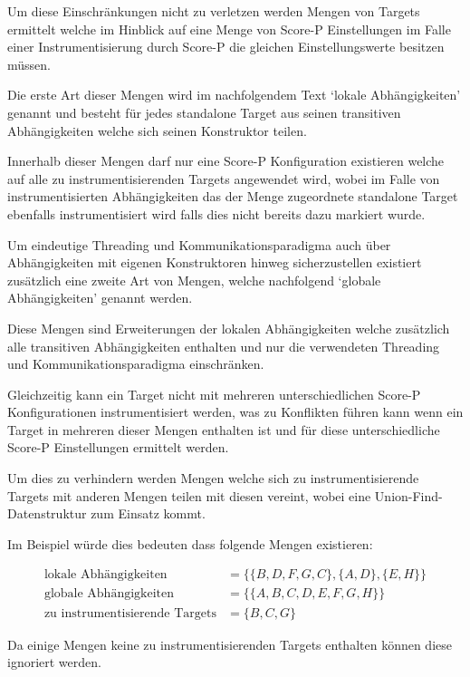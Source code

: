 \documentclass[german,proseminar,hyperref,utf8]{zihpub}
\begin{document}
    Um diese Einschränkungen nicht zu verletzen werden Mengen von Targets ermittelt welche im
    Hinblick auf eine Menge von Score-P Einstellungen im Falle einer Instrumentisierung durch
    Score-P die gleichen Einstellungswerte besitzen müssen.

    Die erste Art dieser Mengen wird im nachfolgendem Text `lokale Abhängigkeiten' genannt und
    besteht für jedes standalone Target aus seinen transitiven Abhängigkeiten welche sich
    seinen Konstruktor teilen.

    Innerhalb dieser Mengen darf nur eine Score-P Konfiguration existieren welche auf alle zu
    instrumentisierenden Targets angewendet wird, wobei im Falle von instrumentisierten Abhängigkeiten
    das der Menge zugeordnete standalone Target ebenfalls instrumentisiert wird falls dies nicht
    bereits dazu markiert wurde.

    Um eindeutige Threading und Kommunikationsparadigma auch über Abhängigkeiten mit eigenen
    Konstruktoren hinweg sicherzustellen existiert zusätzlich eine zweite Art von Mengen, welche
    nachfolgend `globale Abhängigkeiten' genannt werden.

    Diese Mengen sind Erweiterungen der lokalen Abhängigkeiten welche zusätzlich alle transitiven
    Abhängigkeiten enthalten und nur die verwendeten Threading und Kommunikationsparadigma einschränken.

    Gleichzeitig kann ein Target nicht mit mehreren unterschiedlichen Score-P Konfigurationen
    instrumentisiert werden, was zu Konflikten führen kann wenn ein Target in mehreren dieser
    Mengen enthalten ist und für diese unterschiedliche Score-P Einstellungen ermittelt werden.

    Um dies zu verhindern werden Mengen welche sich zu instrumentisierende Targets mit anderen
    Mengen teilen mit diesen vereint, wobei eine Union-Find-Datenstruktur zum Einsatz kommt.
    
    Im Beispiel würde dies bedeuten dass folgende Mengen existieren:

    \begin{align*}
        \text{lokale Abhängigkeiten} &= \{ \{ B, D, F, G, C \}, \{ A, D \}, \{ E, H \} \} \\
        \text{globale Abhängigkeiten} &= \{ \{ A, B, C, D, E, F, G, H \} \} \\
        \text{zu instrumentisierende Targets} &= \{ B, C, G \}
    \end{align*}

    Da einige Mengen keine zu instrumentisierenden Targets enthalten können diese ignoriert werden.
\end{document}
